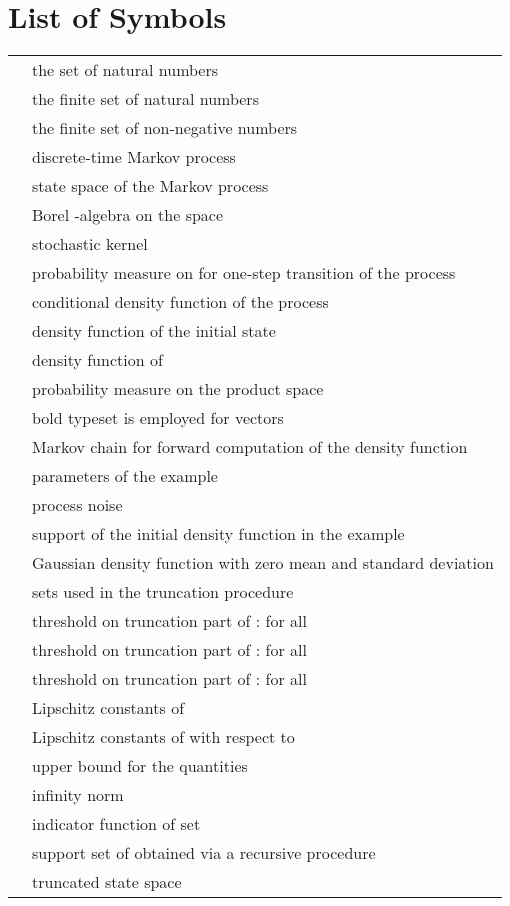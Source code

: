 \documentclass{LMCS}
\begin{document}
\newpage
\section{List of Symbols}
\begin{longtable}{lp{10.5cm}}
& the set of natural numbers\\
& the finite set of natural numbers\\
& the finite set of non-negative numbers\\
 &  discrete-time Markov process\\
 & state space of the Markov process\\
 & Borel -algebra on the space \\
 & stochastic kernel\\
 & probability measure on  for one-step transition of the process\\
& conditional density function of the process\\
& density function of the initial state\\
& density function of \\
& probability measure on the product space \\
& bold typeset is employed for vectors\\
& Markov chain for forward computation of the density function\\
& parameters of the example\\
& process noise\\
& support of the initial density function  in the example\\
& Gaussian density function with zero mean and standard deviation \\
& sets used in the truncation procedure\\
 & threshold on truncation part of :  for all \\
 & threshold on truncation part of :  for all \\
 & threshold on truncation part of : 
 for all \\
& Lipschitz constants of \\
& Lipschitz constants of  with respect to \\ 
 & upper bound for the quantities \\
 & infinity norm\\
 & indicator function of set \\
 & support set of  obtained via a recursive procedure\\
 & truncated state space\\

\end{longtable}
\end{document}
